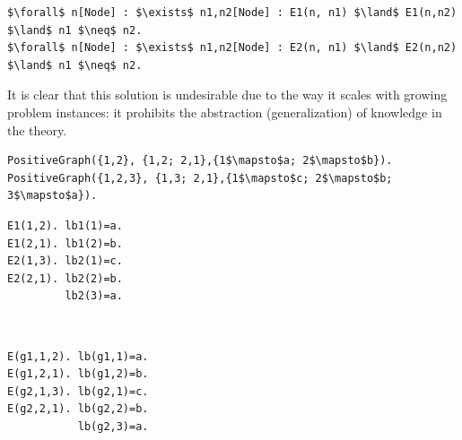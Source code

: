 \begin{minipage}{\linewidth}
\begin{center}
\begin{lstlisting}[style=small,mathescape]
$\forall$ n[Node] : $\exists$ n1,n2[Node] : E1(n, n1) $\land$ E1(n,n2) $\land$ n1 $\neq$ n2.
$\forall$ n[Node] : $\exists$ n1,n2[Node] : E2(n, n1) $\land$ E2(n,n2) $\land$ n1 $\neq$ n2.
\end{lstlisting}
\end{center}
\end{minipage}
\noindent It is clear that this solution is undesirable due to the way it scales 
with growing problem instances: it prohibits the abstraction (generalization) of knowledge in the theory.

\begin{minipage}{\linewidth}
\begin{center}
\begin{minipage}{0.80\linewidth}
  \begin{lstlisting}[style=small,mathescape,caption=Higher order predicate modeling the set $\graphset{G}_{+}$ of \textbf{Def.}~\ref{def:gm2}.,label=lst:HOPred]
PositiveGraph({1,2}, {1,2; 2,1},{1$\mapsto$a; 2$\mapsto$b}).
PositiveGraph({1,2,3}, {1,3; 2,1},{1$\mapsto$c; 2$\mapsto$b; 3$\mapsto$a}).
\end{lstlisting}
\end{minipage}
\end{center}
\vspace{-2em}

\begin{minipage}[t]{0.45\linewidth}
\begin{lstlisting}[style=small,mathescape,caption=Multiple individual global relations,label=lst:multiglobal]
E1(1,2). lb1(1)=a.
E1(2,1). lb1(2)=b.
E2(1,3). lb2(1)=c.
E2(2,1). lb2(2)=b.
         lb2(3)=a.
\end{lstlisting}
\end{minipage}
\begin{minipage}[t]{0.1\linewidth}
 ~
\end{minipage}
\begin{minipage}[t]{0.45\linewidth}
\begin{lstlisting}[style=small,mathescape,caption=Disjoint union using indexed global relations,label=lst:indexedglobal]
E(g1,1,2). lb(g1,1)=a.
E(g1,2,1). lb(g1,2)=b.
E(g2,1,3). lb(g2,1)=c.
E(g2,2,1). lb(g2,2)=b.
           lb(g2,3)=a.
\end{lstlisting}
\end{minipage}
\end{minipage}

